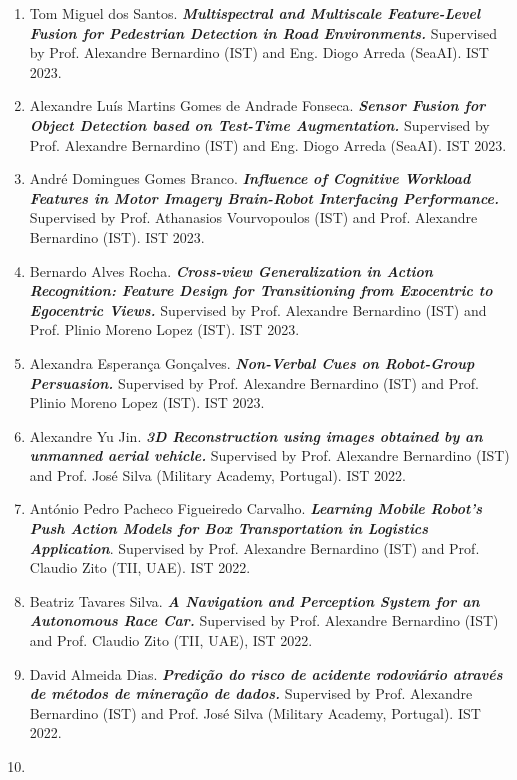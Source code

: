 \documentclass[
]{article}
\begin{document}
\begin{enumerate}
{{  Mechanics.}} Supervised by Prof. Alexandre Bernardino (IST) and Prof.
  Rui Ferreira (IST). IST 2023.
\item
  Tom Miguel dos Santos. \emph{\textbf{Multispectral and Multiscale
  Feature-Level Fusion for Pedestrian Detection in Road Environments.}}
  Supervised by Prof. Alexandre Bernardino (IST) and Eng. Diogo Arreda
  (SeaAI). IST 2023.
\item
  Alexandre Luís Martins Gomes de Andrade Fonseca. \emph{\textbf{Sensor
  Fusion for Object Detection based on Test-Time Augmentation.}}
  Supervised by Prof. Alexandre Bernardino (IST) and Eng. Diogo Arreda
  (SeaAI). IST 2023.
\item
  André Domingues Gomes Branco. \emph{\textbf{Influence of Cognitive
  Workload Features in Motor Imagery Brain-Robot Interfacing
  Performance.}} Supervised by Prof. Athanasios Vourvopoulos (IST) and
  Prof. Alexandre Bernardino (IST). IST 2023.
\item
  Bernardo Alves Rocha. \emph{\textbf{Cross-view Generalization in
  Action Recognition: Feature Design for Transitioning from Exocentric
  to Egocentric Views.}} Supervised by Prof. Alexandre Bernardino (IST)
  and Prof. Plinio Moreno Lopez (IST). IST 2023.
\item
  Alexandra Esperança Gonçalves. \emph{\textbf{Non-Verbal Cues on
  Robot-Group Persuasion.}} Supervised by Prof. Alexandre Bernardino
  (IST) and Prof. Plinio Moreno Lopez (IST). IST 2023.
\item
  Alexandre Yu Jin. \emph{\textbf{3D Reconstruction using images
  obtained by an unmanned aerial vehicle.}} Supervised by Prof.
  Alexandre Bernardino (IST) and Prof. José Silva (Military Academy,
  Portugal). IST 2022.
\item
  António Pedro Pacheco Figueiredo Carvalho. \emph{\textbf{Learning
  Mobile Robot's Push Action Models for Box Transportation in Logistics
  Application}}. Supervised by Prof. Alexandre Bernardino (IST) and
  Prof. Claudio Zito (TII, UAE). IST 2022.
\item
  Beatriz Tavares Silva. \emph{\textbf{A Navigation and Perception
  System for an Autonomous Race Car.}} Supervised by Prof. Alexandre
  Bernardino (IST) and Prof. Claudio Zito (TII, UAE), IST 2022.
\item
  David Almeida Dias. \emph{\textbf{Predição do risco de acidente
  rodoviário através de métodos de mineração de dados.}} Supervised by
  Prof. Alexandre Bernardino (IST) and Prof. José Silva (Military
  Academy, Portugal). IST 2022.
\item

\end{enumerate}
\end{document}
